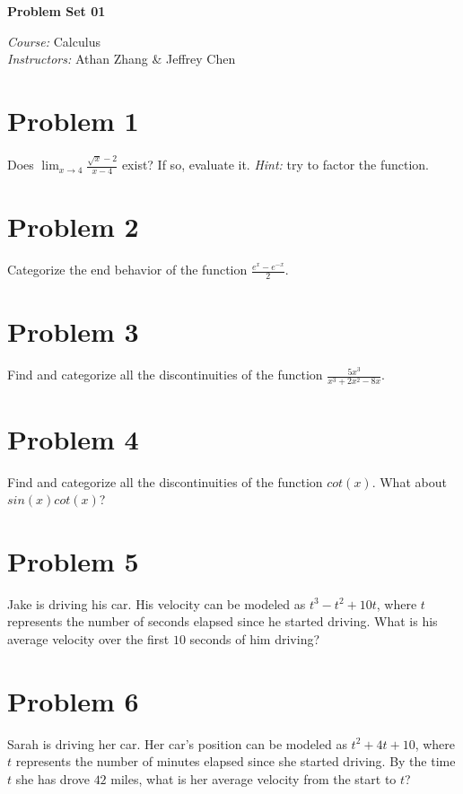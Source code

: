 \documentclass[tikz,border=10pt]{article}
\newcommand{\course}{Calculus}
\newcommand{\instructor}{Athan Zhang \& Jeffrey Chen}
\begin{document}
\begin{center}
\textbf{\Huge Problem Set 01} %
\end{center}

\begin{flushleft}
\emph{Course:} \course \\
\emph{Instructors:} \instructor \\
\end{flushleft}

\section*{Problem 1}
Does $\lim_{x \to 4} \frac{\sqrt{x}-2}{x-4}$ exist? If so, evaluate it. \textit{Hint:} try to factor the function.

\section*{Problem 2}
Categorize the end behavior of the function $\frac{e^x-e^{-x}}{2}$. 


\section*{Problem 3}
Find and categorize all the discontinuities of the function $\frac{5x^3}{x^3+2x^2-8x}$. 


\section*{Problem 4}
Find and categorize all the discontinuities of the function $cot(x)$. What about $sin(x)cot(x)$?


\section*{Problem 5}
Jake is driving his car. His velocity can be modeled as $t^3-t^2+10t$, where $t$ represents the number of seconds elapsed since he started driving. What is his average velocity over the first $10$ seconds of him driving?

\section*{Problem 6}
Sarah is driving her car. Her car's position can be modeled as $t^2+4t+10$, where $t$ represents the number of minutes elapsed since she started driving. By the time $t$ she has drove $42$ miles, what is her average velocity from the start to $t$?
\end{document}
